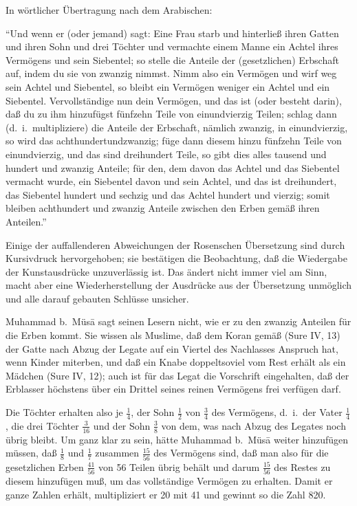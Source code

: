 \documentclass[11pt,a4paper]{article}
\newcommand{\enquote}[1]{``#1''}
\begin{document}
In w\"ortlicher \"Ubertragung nach dem Arabischen:

\enquote{Und wenn er (oder jemand) sagt: Eine Frau starb und hinterlie\ss{} ihren Gatten und ihren Sohn und drei T\"ochter und vermachte einem Manne ein Achtel ihres Verm\"ogens und sein Siebentel; so stelle die Anteile der (gesetzlichen) Erbschaft auf, indem du sie von zwanzig nimmst. Nimm also ein Verm\"ogen und wirf weg sein Achtel und Siebentel, so bleibt ein Verm\"ogen weniger ein Achtel und ein Siebentel. Vervollst\"andige nun dein Verm\"ogen, und das ist (oder besteht darin), da\ss{} du zu ihm hinzuf\"ugst f\"unfzehn Teile von einundvierzig Teilen; schlag dann (d.\ i.\ multipliziere) die Anteile der Erbschaft, n\"amlich zwanzig, in einundvierzig, so wird das achthundertundzwanzig; f\"uge dann diesem hinzu f\"unfzehn Teile von einundvierzig, und das sind dreihundert Teile, so gibt dies alles tausend und hundert und zwanzig Anteile; f\"ur den, dem davon das Achtel und das Siebentel vermacht wurde, ein Siebentel davon und sein Achtel, und das ist dreihundert, das Siebentel hundert und sechzig und das Achtel hundert und vierzig; somit bleiben achthundert und zwanzig Anteile zwischen den Erben gem\"a\ss{} ihren Anteilen.}

Einige der auffallenderen Abweichungen der Rosenschen \"Ubersetzung sind durch Kursivdruck hervorgehoben; sie best\"atigen die Beobachtung, da\ss{} die Wiedergabe der Kunstausdr\"ucke unzuverl\"assig ist. Das \"andert nicht immer viel am Sinn, macht aber eine Wiederherstellung der Ausdr\"ucke aus der \"Ubersetzung unm\"oglich und alle darauf gebauten Schl\"usse unsicher.

Muhammad b.\ M\"us\=a sagt seinen Lesern nicht, wie er zu den zwanzig Anteilen f\"ur die Erben kommt. Sie wissen als Muslime, da\ss{} dem Koran gem\"a\ss{} (Sure IV, 13) der Gatte nach Abzug der Legate auf ein Viertel des Nachlasses Anspruch hat, wenn Kinder miterben, und da\ss{} ein Knabe doppeltsoviel vom Rest erh\"alt als ein M\"adchen (Sure IV, 12); auch ist f\"ur das Legat die Vorschrift eingehalten, da\ss{} der Erblasser h\"ochstens \"uber ein Drittel seines reinen Verm\"ogens frei verf\"ugen darf.

Die T\"ochter erhalten also je $\frac{1}{4}$, der Sohn $\frac{1}{2}$ von $\frac{3}{4}$ des Verm\"ogens, d.\ i.\ der Vater $\frac{1}{4}$, die drei T\"ochter $\frac{3}{16}$ und der Sohn $\frac{3}{8}$ von dem, was nach Abzug des Legates noch \"ubrig bleibt. Um ganz klar zu sein, h\"atte Muhammad b.\ M\"us\=a weiter hinzuf\"ugen m\"ussen, da\ss{} $\frac{1}{8}$ und $\frac{1}{7}$ zusammen $\frac{15}{56}$ des Verm\"ogens sind, da\ss{} man also f\"ur die gesetzlichen Erben $\frac{41}{56}$ von 56 Teilen \"ubrig beh\"alt und darum $\frac{15}{56}$ des Restes zu diesem hinzuf\"ugen mu\ss{}, um das vollst\"andige Verm\"ogen zu erhalten. Damit er ganze Zahlen erh\"alt, multipliziert er 20 mit 41 und gewinnt so die Zahl 820.
\end{document}
